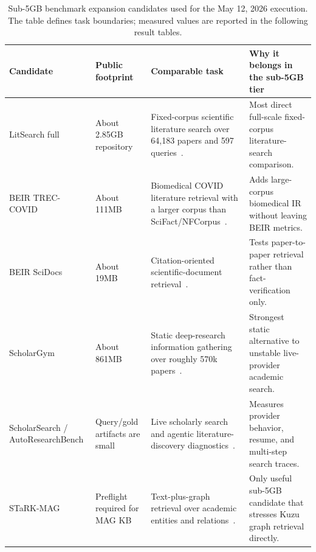 \documentclass[11pt]{article}
\begin{document}
\begin{table}[t]
\centering
\caption{Sub-5GB benchmark expansion candidates used for the May 12, 2026 execution. The table defines task boundaries; measured values are reported in the following result tables.}
\label{tab:sub5g-expansion-candidates}
\scriptsize
\begin{tabularx}{\linewidth}{@{}l l Y Y@{}}
\toprule
Candidate & Public footprint & Comparable task & Why it belongs in the sub-5GB tier \\
\midrule
LitSearch full & About 2.85GB repository & Fixed-corpus scientific literature search over 64,183 papers and 597 queries~\citep{litsearch}. & Most direct full-scale fixed-corpus literature-search comparison. \\
BEIR TREC-COVID & About 111MB & Biomedical COVID literature retrieval with a larger corpus than SciFact/NFCorpus~\citep{beir}. & Adds large-corpus biomedical IR without leaving BEIR metrics. \\
BEIR SciDocs & About 19MB & Citation-oriented scientific-document retrieval~\citep{beir}. & Tests paper-to-paper retrieval rather than fact-verification only. \\
ScholarGym & About 861MB & Static deep-research information gathering over roughly 570k papers~\citep{scholargym}. & Strongest static alternative to unstable live-provider academic search. \\
ScholarSearch / AutoResearchBench & Query/gold artifacts are small & Live scholarly search and agentic literature-discovery diagnostics~\citep{scholarsearch,autoresearchbench}. & Measures provider behavior, resume, and multi-step search traces. \\
STaRK-MAG & Preflight required for MAG KB & Text-plus-graph retrieval over academic entities and relations~\citep{stark}. & Only useful sub-5GB candidate that stresses Kuzu graph retrieval directly. \\
\bottomrule
\end{tabularx}
\end{table}
\end{document}
